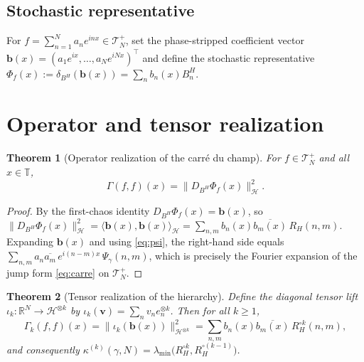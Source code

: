 \documentclass[11pt,reqno]{amsart}
\theoremstyle{plain}
\newtheorem{theorem}{Theorem}[section]
\theoremstyle{definition}
\newcommand{\T}{\mathbb{T}}
\newcommand{\R}{\mathbb{R}}
\newcommand{\HH}{\mathcal{H}}
\newcommand{\Had}{\mathbin{\circ}}     %
\newcommand{\Bm}{B^{H}}
\newcommand{\Gam}{\Gamma}
\begin{document}
\subsection{Stochastic representative}
For $f=\sum_{n=1}^{N}a_n e^{inx}\in\mathcal T_N^{+}$, set the phase-stripped
coefficient vector $\mathbf b(x)=(a_1e^{ix},\dots,a_Ne^{iNx})^{\top}$ and define
the stochastic representative
$\Phi_f(x):=\delta_{\Bm}(\mathbf b(x))=\sum_n b_n(x)\Bm_n$.

\section{Operator and tensor realization}\label{sec:real}

\begin{theorem}[Operator realization of the carr\'e du champ]\label{thm:opreal}
For $f\in\mathcal T_N^{+}$ and all $x\in\T$,
\begin{equation}\label{eq:opreal}
  \Gam(f,f)(x)=\bigl\|D_{\Bm}\Phi_f(x)\bigr\|_{\HH}^{2}.
\end{equation}
\end{theorem}

\begin{proof}
By the first-chaos identity $D_{\Bm}\Phi_f(x)=\mathbf b(x)$, so
$\|D_{\Bm}\Phi_f(x)\|_{\HH}^{2}=\langle\mathbf b(x),\mathbf b(x)\rangle_{\HH}
=\sum_{n,m}b_n(x)\overline{b_m(x)}\,R_H(n,m)$. Expanding
$\mathbf b(x)$ and using \eqref{eq:psi}, the right-hand side equals
$\sum_{n,m}a_n\overline{a_m}\,e^{i(n-m)x}\,\Psi_\gamma(n,m)$, which is precisely
the Fourier expansion of the jump form \eqref{eq:carre} on $\mathcal T_N^{+}$.
\end{proof}

\begin{theorem}[Tensor realization of the hierarchy]\label{thm:tensor}
Define the diagonal tensor lift $\iota_k:\R^N\to\HH^{\otimes k}$ by
$\iota_k(\mathbf v)=\sum_n v_n e_n^{\otimes k}$. Then for all $k\ge1$,
\begin{equation}\label{eq:tensorreal}
  \Gam_k(f,f)(x)=\bigl\|\iota_k(\mathbf b(x))\bigr\|_{\HH^{\otimes k}}^{2}
  =\sum_{n,m}b_n(x)\overline{b_m(x)}\,R_H^{\Had k}(n,m),
\end{equation}
and consequently
$\kappa^{(k)}(\gamma,N)=\lambda_{\min}\!\bigl(R_H^{\Had k},R_H^{\Had(k-1)}\bigr)$.
\end{theorem}
\end{document}
